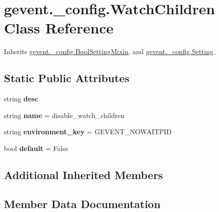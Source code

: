 \hypertarget{classgevent_1_1__config_1_1_watch_children}{}\section{gevent.\+\_\+config.\+Watch\+Children Class Reference}
\label{classgevent_1_1__config_1_1_watch_children}


Inherits \hyperlink{classgevent_1_1__config_1_1_bool_setting_mixin}{gevent.\+\_\+config.\+Bool\+Setting\+Mixin}, and \hyperlink{classgevent_1_1__config_1_1_setting}{gevent.\+\_\+config.\+Setting}.

\subsection*{Static Public Attributes}
\begin{DoxyCompactItemize}
\item 
string {\bfseries desc}
\item 
\mbox{\label{classgevent_1_1__config_1_1_watch_children_adedd749460b994547dab1a36171228d1}} 
string {\bfseries name} = \textquotesingle{}disable\+\_\+watch\+\_\+children\textquotesingle{}
\item 
\mbox{\label{classgevent_1_1__config_1_1_watch_children_a084ada0619a17f0b8cb4cf701330a2c4}} 
string {\bfseries environment\+\_\+key} = \textquotesingle{}G\+E\+V\+E\+N\+T\+\_\+\+N\+O\+W\+A\+I\+T\+P\+ID\textquotesingle{}
\item 
\mbox{\label{classgevent_1_1__config_1_1_watch_children_ad2ecfe2fcc79124597f1f4ded20bf869}} 
bool {\bfseries default} = False
\end{DoxyCompactItemize}
\subsection*{Additional Inherited Members}


\subsection{Member Data Documentation}
\mbox{\label{classgevent_1_1__config_1_1_watch_children_a3102a5d2f9bb617e23183fe43458371d}} 
